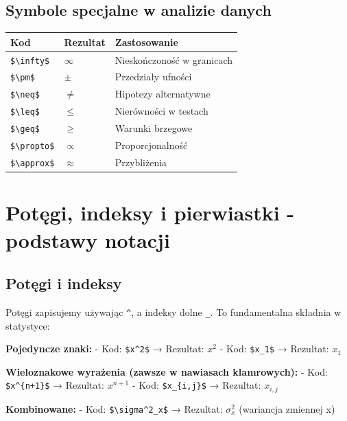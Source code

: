 \documentclass[
  polish,
  letterpaper,
  DIV=11,
  numbers=noendperiod]{scrreprt}
\newcounter{none} %
\begin{document}
\subsection{Symbole specjalne w analizie
danych}\label{symbole-specjalne-w-analizie-danych}

{\def\LTcaptype{none} %
\begin{longtable}[]{@{}lll@{}}
\toprule\noalign{}
Kod & Rezultat & Zastosowanie \\
\midrule\noalign{}
\endhead
\bottomrule\noalign{}
\endlastfoot
\texttt{\$\textbackslash{}infty\$} & \(\infty\) & Nieskończoność w
granicach \\
\texttt{\$\textbackslash{}pm\$} & \(\pm\) & Przedziały ufności \\
\texttt{\$\textbackslash{}neq\$} & \(\neq\) & Hipotezy alternatywne \\
\texttt{\$\textbackslash{}leq\$} & \(\leq\) & Nierówności w testach \\
\texttt{\$\textbackslash{}geq\$} & \(\geq\) & Warunki brzegowe \\
\texttt{\$\textbackslash{}propto\$} & \(\propto\) & Proporcjonalność \\
\texttt{\$\textbackslash{}approx\$} & \(\approx\) & Przybliżenia \\
\end{longtable}
}

\section{Potęgi, indeksy i pierwiastki - podstawy
notacji}\label{potux119gi-indeksy-i-pierwiastki---podstawy-notacji}

\subsection{Potęgi i indeksy}\label{potux119gi-i-indeksy}

Potęgi zapisujemy używając \texttt{\^{}}, a indeksy dolne \texttt{\_}.
To fundamentalna składnia w statystyce:

\textbf{Pojedyncze znaki:} - Kod: \texttt{\$x\^{}2\$} → Rezultat:
\(x^2\) - Kod: \texttt{\$x\_1\$} → Rezultat: \(x_1\)

\textbf{Wieloznakowe wyrażenia (zawsze w nawiasach klamrowych):} - Kod:
\texttt{\$x\^{}\{n+1\}\$} → Rezultat: \(x^{n+1}\) - Kod:
\texttt{\$x\_\{i,j\}\$} → Rezultat: \(x_{i,j}\)

\textbf{Kombinowane:} - Kod: \texttt{\$\textbackslash{}sigma\^{}2\_x\$}
→ Rezultat: \(\sigma^2_x\) (wariancja zmiennej x)
\end{document}
